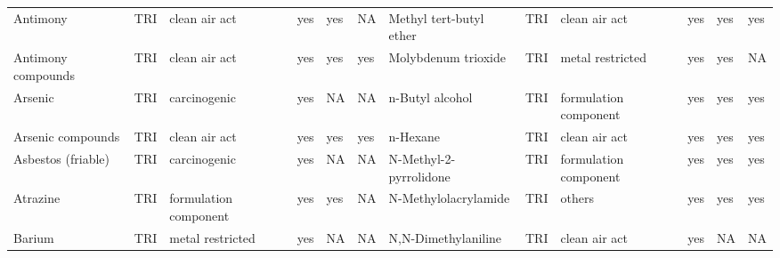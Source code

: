 \begin{table}[H]
{\begin{tabular}{llllllllllll}
            Antimony                                                                   & TRI            & clean air act         & yes    & yes     & NA   & Methyl tert-butyl ether                                                                                            & TRI            & clean air act         & yes & yes & yes\\
            Antimony compounds                                                         & TRI            & clean air act         & yes    & yes     & yes  & Molybdenum trioxide                                                                                                & TRI            & metal restricted & yes & yes & NA\\
            Arsenic                                                                    & TRI            & carcinogenic          & yes    & NA      & NA   & n-Butyl alcohol                                                                                                    & TRI            & formulation component & yes & yes & yes\\
            Arsenic compounds                                                          & TRI            & clean air act         & yes    & yes     & yes  & n-Hexane                                                                                                           & TRI            & clean air act         & yes    & yes & yes\\
            Asbestos (friable)                                                         & TRI            & carcinogenic          & yes    & NA      & NA   & N-Methyl-2-pyrrolidone                                                                                             & TRI            & formulation component & yes & yes & yes\\
            Atrazine                                                                   & TRI            & formulation component & yes    & yes     & NA   & N-Methylolacrylamide                                                                                               & TRI            & others                & yes & yes & yes\\
            Barium                                                                     & TRI            & metal restricted      & yes    & NA      & NA   & N,N-Dimethylaniline                                                                                                & TRI            & clean air act         & yes    & NA & NA\\

\end{tabular}}
\end{table}
